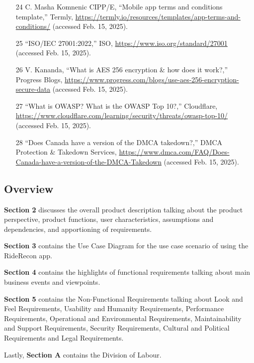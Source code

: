 \documentclass[]{article}
\begin{document}
\begin{itemize}
	\item[24] C. Masha Komnenic CIPP/E, “Mobile app terms and conditions template,” Termly, \url{https://termly.io/resources/templates/app-terms-and-conditions/} (accessed Feb. 15, 2025).
	\item[25] “ISO/IEC 27001:2022,” ISO, \url{https://www.iso.org/standard/27001} (accessed Feb. 15, 2025).
	\item[26] V. Kananda, “What is AES 256 encryption \& how does it work?,” Progress Blogs, \url{https://www.progress.com/blogs/use-aes-256-encryption-secure-data} (accessed Feb. 15, 2025).
	\item[27] “What is OWASP? What is the OWASP Top 10?,” Cloudflare, \url{https://www.cloudflare.com/learning/security/threats/owasp-top-10/} (accessed Feb. 15, 2025).
	\item[28] “Does Canada have a version of the DMCA takedown?,” DMCA Protection \& Takedown Services, \url{https://www.dmca.com/FAQ/Does-Canada-have-a-version-of-the-DMCA-Takedown} (accessed Feb. 15, 2025).

\end{itemize}


\subsection{Overview}
\label{sub:overview}

\textbf{Section 2} discusses the overall product description talking about the product perspective, product functions, user characteristics, assumptions and dependencies, and apportioning of requirements. 

\textbf{Section 3} contains the Use Case Diagram for the use case scenario of using the RideRecon app. 

\textbf{Section 4} contains the highlights of functional requirements talking about main business events and viewpoints. 

\textbf{Section 5} contains the Non-Functional Requirements talking about Look and Feel Requirements, Usability and Humanity Requirements, Performance Requirements, Operational and Environmental Requirements, Maintainability and Support Requirements, Security Requirements, Cultural and Political Requirements and Legal Requirements. 

Lastly, \textbf{Section A} contains the Division of Labour.


\newpage
\end{document}

